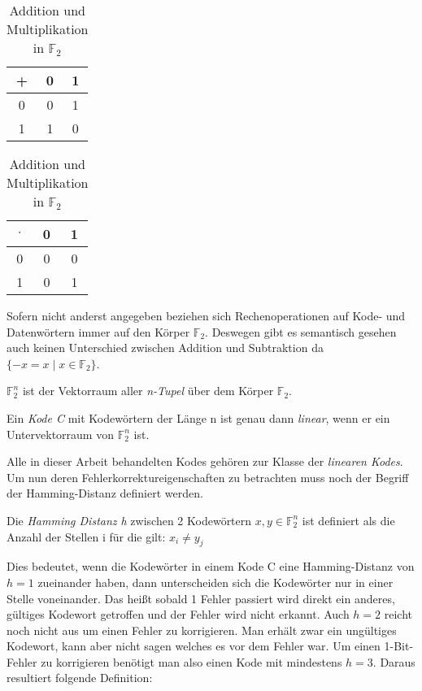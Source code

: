 \begin{table}[!h]
\begin{center}
\begin{tabular}{c|cc}
+ & 0 & 1 \\
\hline
0 & 0 & 1 \\
1 & 1 & 0 \\
\end{tabular}
\hspace{2cm}
\begin{tabular}{c|cc}
$\cdot$ & 0 & 1 \\
\hline
0 & 0 & 0 \\
1 & 0 & 1 \\
\end{tabular}
\caption{Addition und Multiplikation in $\mathbb{F}_2$}
\label{table:addmul}
\end{center}
\end{table}

Sofern nicht anderst angegeben beziehen sich Rechenoperationen auf Kode- und Datenwörtern immer auf den Körper $\mathbb{F}_2$. Deswegen gibt es semantisch gesehen auch keinen Unterschied zwischen Addition und Subtraktion da $\{-x = x \mid x \in \mathbb{F}_2\}$.\cite[Kap. 1.1]{huffman2010fundamentals}

\begin{t_def}
$\mathbb{F}_{2}^{n}$ ist der Vektorraum aller {\em n-Tupel} über dem Körper $\mathbb{F}_2$.
\end{t_def}


\begin{t_def}
Ein {\em Kode C} mit Kodewörtern der Länge n ist genau dann {\em linear}, wenn er ein Untervektorraum von $\mathbb{F}_{2}^{n}$ ist.
\end{t_def}

Alle in dieser Arbeit behandelten Kodes gehören zur Klasse der \textit{linearen Kodes}.\cite[Kap. 1.2]{huffman2010fundamentals} Um nun deren Fehlerkorrektureigenschaften zu betrachten muss noch der Begriff der Hamming-Distanz definiert werden.

\begin{t_def}
Die {\em Hamming Distanz h} zwischen 2 Kodewörtern $x,y \in \mathbb{F}_{2}^{n}$ ist definiert als die Anzahl der Stellen i für die gilt: $x_i \neq y_j$
\end{t_def}

Dies bedeutet, wenn die Kodewörter in einem Kode C eine Hamming-Distanz von $h=1$ zueinander haben, dann unterscheiden sich die Kodewörter nur in einer Stelle voneinander. Das heißt sobald 1 Fehler passiert wird direkt ein anderes, gültiges Kodewort getroffen und der Fehler wird nicht erkannt. Auch $h=2$ reicht noch nicht aus um einen Fehler zu korrigieren. Man erhält zwar ein ungültiges Kodewort, kann aber nicht sagen welches es vor dem Fehler war. Um einen 1-Bit-Fehler zu korrigieren benötigt man also einen Kode mit mindestens $h=3$.\cite[Kap. 1.4]{huffman2010fundamentals} Daraus resultiert folgende Definition:

